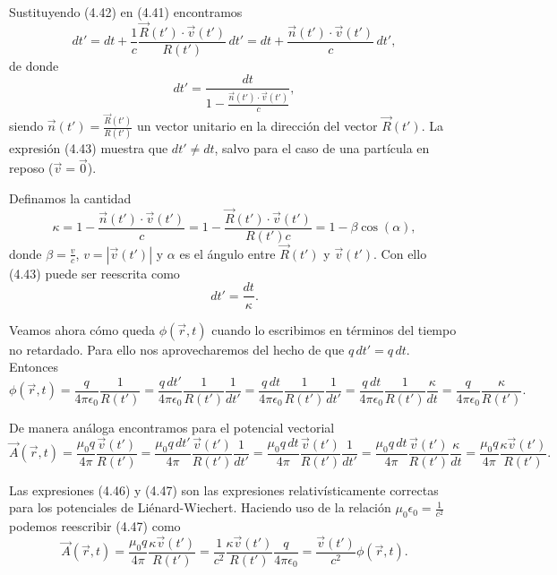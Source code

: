 \documentclass[12pt,a4paper]{book}
\begin{document}
Sustituyendo (4.42) en (4.41) encontramos
\begin{equation}
dt' = dt + \frac{1}{c}\frac{\vec{R}(t') \cdot \vec{v}(t')}{R(t')}\,dt' = dt + \frac{\vec{n}(t') \cdot \vec{v}(t')}{c}\,dt',
\end{equation}
de donde
\begin{equation}
dt' = \frac{dt}{1 - \frac{\vec{n}(t') \cdot \vec{v}(t')}{c}},
\end{equation}
siendo $\vec{n}(t') = \frac{\vec{R}(t')}{R(t')}$ un vector unitario en la dirección del vector $\vec{R}(t')$. La expresión (4.43) muestra que $dt' \neq dt$, salvo para el caso de una partícula en reposo ($\vec{v} = \vec{0}$).

Definamos la cantidad
\begin{equation}
\kappa = 1 - \frac{\vec{n}(t') \cdot \vec{v}(t')}{c} = 1 - \frac{\vec{R}(t') \cdot \vec{v}(t')}{R(t')c} = 1 - \beta\cos(\alpha),
\end{equation}
donde $\beta = \frac{v}{c}$, $v = |\vec{v}(t')|$ y $\alpha$ es el ángulo entre $\vec{R}(t')$ y $\vec{v}(t')$. Con ello (4.43) puede ser reescrita como
\begin{equation}
dt' = \frac{dt}{\kappa}.
\end{equation}

Veamos ahora cómo queda $\phi(\vec{r}, t)$ cuando lo escribimos en términos del tiempo no retardado. Para ello nos aprovecharemos del hecho de que $q\,dt' = q\,dt$. Entonces
\begin{equation}
\phi(\vec{r}, t) = \frac{q}{4\pi\epsilon_0}\frac{1}{R(t')} = \frac{q\,dt'}{4\pi\epsilon_0}\frac{1}{R(t')}\frac{1}{dt'} = \frac{q\,dt}{4\pi\epsilon_0}\frac{1}{R(t')}\frac{1}{dt'} = \frac{q\,dt}{4\pi\epsilon_0}\frac{1}{R(t')}\frac{\kappa}{dt} = \frac{q}{4\pi\epsilon_0}\frac{\kappa}{R(t')}.
\end{equation}

De manera análoga encontramos para el potencial vectorial
\begin{equation}
\vec{A}(\vec{r}, t) = \frac{\mu_0 q}{4\pi}\frac{\vec{v}(t')}{R(t')} = \frac{\mu_0 q\,dt'}{4\pi}\frac{\vec{v}(t')}{R(t')}\frac{1}{dt'} = \frac{\mu_0 q\,dt}{4\pi}\frac{\vec{v}(t')}{R(t')}\frac{1}{dt'} = \frac{\mu_0 q\,dt}{4\pi}\frac{\vec{v}(t')}{R(t')}\frac{\kappa}{dt} = \frac{\mu_0 q}{4\pi}\frac{\kappa\vec{v}(t')}{R(t')}.
\end{equation}

Las expresiones (4.46) y (4.47) son las expresiones relativísticamente correctas para los potenciales de Liénard-Wiechert. Haciendo uso de la relación $\mu_0\epsilon_0 = \frac{1}{c^2}$ podemos reescribir (4.47) como
\begin{equation}
\vec{A}(\vec{r}, t) = \frac{\mu_0 q}{4\pi}\frac{\kappa\vec{v}(t')}{R(t')} = \frac{1}{c^2}\frac{\kappa\vec{v}(t')}{R(t')}\frac{q}{4\pi\epsilon_0} = \frac{\vec{v}(t')}{c^2}\phi(\vec{r}, t).
\end{equation}
\end{document}
